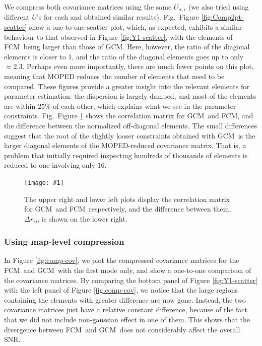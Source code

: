 \documentclass[twocolumn]{\docclass}
\newcommand{\sfig}[2]{
	\texttt{[image: \#1]}
}
\newcommand{\Sfig}[2]{
	\begin{figure}[thbp]
		\sfig{../figures/#1.pdf}{\columnwidth}
		\caption{{\small #2}}
		\label{fig:#1}
	\end{figure}
}
\newcommand{\rf}[1]{Figure \ref{fig:#1}}
\newcommand\full{FCM}
\newcommand\gaussian{GCM}
\begin{document}
	We compress both covariance matrices using the same $U_{\alpha, i}$ (we also tried using different $U$'s for each and obtained similar results).
	Fig.~\rf{Comp2pt-scatter} show a one-to-one scatter plot, which, as expected, exhibits a similar behaviour to that observed in \rf{Y1-scatter}, with the elements of \full\ being larger than those of \gaussian. Here, however, the ratio of the diagonal elements is closer to 1, and the ratio of the diagonal elements goes up to only $\approx 2.3$. Perhaps even more importantly, there are much fewer points on this plot, meaning that MOPED reduces the number of elements that need to be compared. These figures provide a greater insight into the relevant elements for parameter estimation: the dispersion is largely damped, and most of the elements are within $25\%$ of each other, which explains what we see in the parameter constraints. Fig.~\rf{Comp2pt-correlation} shows the correlation matrix for \gaussian\ and \full, and the difference between the normalized off-diagonal elements. The small differences suggest that the root of the slightly looser constraints obtained with \gaussian\ is the larger diagonal elements of the MOPED-reduced covariance matrix. That is, a problem that initially required inspecting hundreds of thousands of elements is reduced to one involving only 16.
	
	\Sfig{Comp2pt-correlation}{The upper right and lower left plots display the correlation matrix for \gaussian\ and \full\ respectively, and the difference between them, $\Delta r_{ij}$, is shown on the lower right.}
	
	\subsubsection{Using map-level compression}
	In \rf{comp-cov}, we plot the compressed covariance matrices for the \full\ and \gaussian\ with the first mode only, and show a one-to-one comparison of the covariance matrices. By comparing the bottom panel of  \rf{Y1-scatter} with the left panel of \rf{comp-cov}, we notice that the large regions containing the elements with greater difference are now gone. Instead, the two covariance matrices just have a relative constant difference, because of the fact that we did not include non-gaussian effect in one of them. This shows that the divergence between \full\ and \gaussian\ does not considerably affect the overall SNR. 
	
\end{document}
